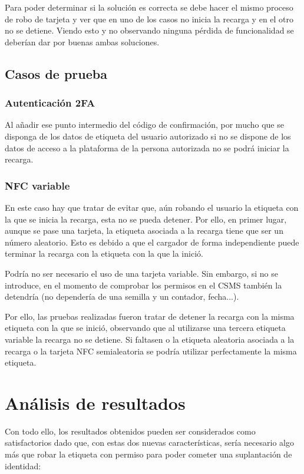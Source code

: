 \documentclass[12pt,a4paper,onecolumn,oneside]{report}
\begin{document}
Para poder determinar si la solución es correcta se debe hacer el mismo proceso de robo de tarjeta y ver que en uno de los casos no inicia la recarga y en el otro no se detiene. Viendo esto y no observando ninguna pérdida de funcionalidad se deberían dar por buenas ambas soluciones.

\subsection{Casos de prueba}

\subsubsection{Autenticación 2FA}
Al añadir ese punto intermedio del código de confirmación, por mucho que se disponga de los datos de etiqueta del usuario autorizado si no se dispone de los datos de acceso a la plataforma de la persona autorizada no se podrá iniciar la recarga.

\subsubsection{NFC variable}

En este caso hay que tratar de evitar que, aún robando el usuario la etiqueta con la que se inicia la recarga, esta no se pueda detener. Por ello, en primer lugar, aunque se pase una tarjeta, la etiqueta asociada a la recarga tiene que ser un número aleatorio. Esto es debido a que el cargador de forma independiente puede terminar la recarga con la etiqueta con la que la inició.

Podría no ser necesario el uso de una tarjeta variable. Sin embargo, si no se introduce, en el momento de comprobar los permisos en el CSMS también la detendría (no dependería de una semilla y un contador, fecha...).

Por ello, las pruebas realizadas fueron tratar de detener la recarga con la misma etiqueta con la que se inició, observando que al utilizarse una tercera etiqueta variable la recarga no se detiene. Si faltasen o la etiqueta aleatoria asociada a la recarga o la tarjeta NFC semialeatoria se podría utilizar perfectamente la misma etiqueta.

\section{Análisis de resultados}

Con todo ello, los resultados obtenidos pueden ser considerados como satisfactorios dado que, con estas dos nuevas características, sería necesario algo más que robar la etiqueta con permiso para poder cometer una suplantación de identidad:
\end{document}
